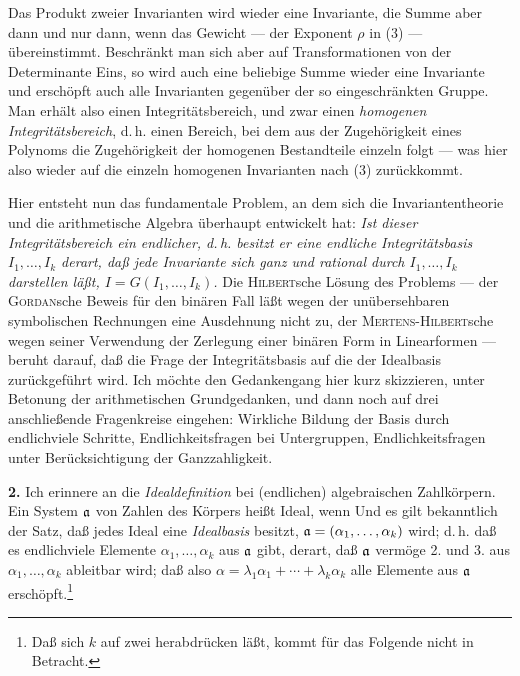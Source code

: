 Das Produkt zweier Invarianten wird wieder eine Invariante, die Summe aber dann und nur dann, wenn das Gewicht --- der Exponent $\rho$ in (3) --- übereinstimmt. Beschränkt man sich aber auf Transformationen von der Determinante Eins, so wird auch eine beliebige Summe wieder eine Invariante und erschöpft auch alle Invarianten gegenüber der so eingeschränkten Gruppe. Man erhält also einen Integritätsbereich, und zwar einen \emph{homogenen Integritätsbereich}, d.\,h. einen Bereich, bei dem aus der Zugehörigkeit eines Polynoms die Zugehörigkeit der homogenen Bestandteile einzeln folgt --- was hier also wieder auf die einzeln homogenen Invarianten nach (3) zurückkommt.

Hier entsteht nun das fundamentale Problem, an dem sich die Invariantentheorie und die arithmetische Algebra überhaupt entwickelt hat: \emph{Ist dieser Integritätsbereich ein endlicher, d.\,h. besitzt er eine endliche Integritätsbasis $I_1,\ldots,I_k$ derart, daß jede Invariante sich ganz und rational durch $I_1,\ldots,I_k$ darstellen läßt, $I=G(I_1,\ldots,I_k)$.} Die \textsc{Hilbert}sche Lösung des Problems --- der \textsc{Gordan}sche Beweis für den binären Fall läßt wegen der unübersehbaren symbolischen Rechnungen eine Ausdehnung nicht zu, der \textsc{Mertens-Hilbert}sche wegen seiner Verwendung der Zerlegung einer binären Form in Linearformen --- beruht darauf, daß die Frage der Integritätsbasis auf die der Idealbasis zurückgeführt wird. Ich möchte den Gedankengang hier kurz skizzieren, unter Betonung der arithmetischen Grundgedanken, und dann noch auf drei anschließende Fragenkreise eingehen: Wirkliche Bildung der Basis durch endlichviele Schritte, Endlichkeitsfragen bei Untergruppen, Endlichkeitsfragen unter Berücksichtigung der Ganzzahligkeit.

\textbf{2.} Ich erinnere an die \emph{Idealdefinition} bei (endlichen) algebraischen Zahlkörpern. Ein System $\mathfrak a$ von Zahlen des Körpers heißt Ideal, wenn
Und es gilt bekanntlich der Satz, daß jedes Ideal eine \emph{Idealbasis} besitzt, $\mathfrak a=(\alpha_1,\ldots,\alpha_k)$ wird; d.\,h. daß es endlichviele Elemente $\alpha_1,\ldots,\alpha_k$ aus $\mathfrak a$ gibt, derart, daß $\mathfrak a$ vermöge 2. und 3. aus $\alpha_1,\ldots,\alpha_k$ ableitbar wird; daß also $\alpha=\lambda_1\alpha_1+\cdots+\lambda_k\alpha_k$ alle Elemente aus $\mathfrak a$ erschöpft.\footnote{Daß sich $k$ auf zwei herabdrücken läßt, kommt für das Folgende nicht in Betracht.}

